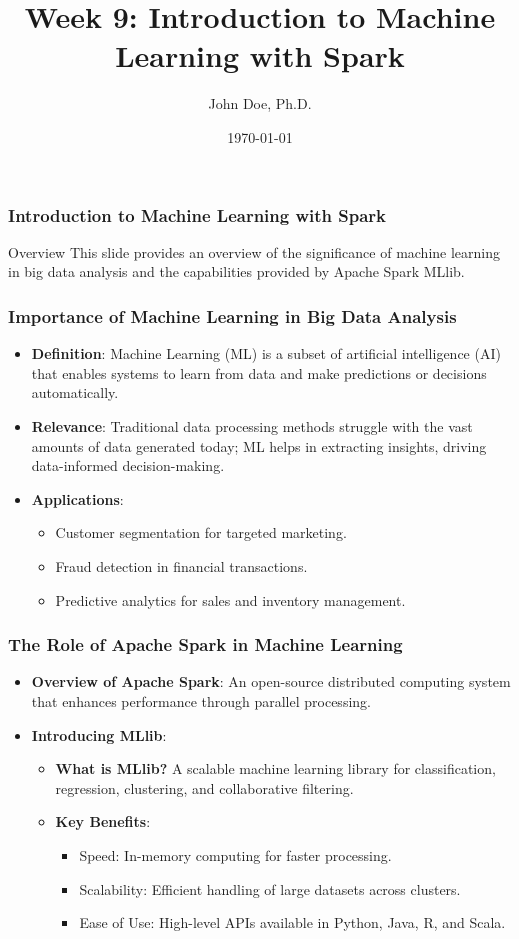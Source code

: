 \documentclass[aspectratio=169]{beamer}
\title[Introduction to Machine Learning with Spark]{Week 9: Introduction to Machine Learning with Spark}
\author[J. Doe]{John Doe, Ph.D.}
\institute[University Name]{
  Department of Computer Science\\
  University Name\\
  \vspace{0.3cm}
  Email: email@university.edu\\
  Website: www.university.edu
}
\date{\today}
\begin{document}
\frame{\titlepage}

\begin{frame}[fragile]
    \frametitle{Introduction to Machine Learning with Spark}
    \begin{block}{Overview}
        This slide provides an overview of the significance of machine learning in big data analysis and the capabilities provided by Apache Spark MLlib.
    \end{block}
\end{frame}

\begin{frame}[fragile]
    \frametitle{Importance of Machine Learning in Big Data Analysis}
    \begin{itemize}
        \item \textbf{Definition}: Machine Learning (ML) is a subset of artificial intelligence (AI) that enables systems to learn from data and make predictions or decisions automatically.
        \item \textbf{Relevance}: Traditional data processing methods struggle with the vast amounts of data generated today; ML helps in extracting insights, driving data-informed decision-making.
        \item \textbf{Applications}:
        \begin{itemize}
            \item Customer segmentation for targeted marketing.
            \item Fraud detection in financial transactions.
            \item Predictive analytics for sales and inventory management.
        \end{itemize}
    \end{itemize}
\end{frame}

\begin{frame}[fragile]
    \frametitle{The Role of Apache Spark in Machine Learning}
    \begin{itemize}
        \item \textbf{Overview of Apache Spark}: An open-source distributed computing system that enhances performance through parallel processing.
        \item \textbf{Introducing MLlib}:
        \begin{itemize}
            \item \textbf{What is MLlib?} A scalable machine learning library for classification, regression, clustering, and collaborative filtering.
            \item \textbf{Key Benefits}:
            \begin{itemize}
                \item Speed: In-memory computing for faster processing.
                \item Scalability: Efficient handling of large datasets across clusters.
                \item Ease of Use: High-level APIs available in Python, Java, R, and Scala.
            \end{itemize}
        \end{itemize}
    \end{itemize}
\end{frame}
\end{document}
